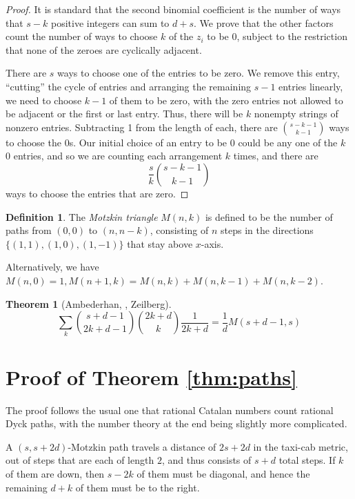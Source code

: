 \documentclass{amsart}
\theoremstyle{definition}
\newtheorem{theorem}{Theorem}
\newtheorem{definition}{Definition}
\begin{document}
\begin{proof}
It is standard that the second binomial coefficient is the number of ways that $s-k$ positive integers can sum to $d+s$.  We prove that the other factors count the number of ways to choose $k$ of the $z_i$ to be 0, subject to the restriction that none of the zeroes are cyclically adjacent.

There are $s$ ways to choose one of the entries to be zero.  We remove this entry, ``cutting'' the cycle of entries and arranging the remaining $s-1$ entries linearly, we need to choose $k-1$ of them to be zero, with the zero entries not allowed to be adjacent or the first or last entry.  Thus, there will be $k$ nonempty strings of nonzero entries.  Subtracting 1 from the length of each,  there are $\binom{s-k-1}{k-1}$ ways to choose the $0$s.  Our initial choice of an entry to be 0 could be any one of the $k$ 0 entries, and so we are counting each arrangement $k$ times, and there are
$$\frac{s}{k}\binom{s-k-1}{k-1}$$ ways to choose the entries that are zero.
\end{proof}

\begin{definition} 
The \emph{Motzkin triangle} $M(n,k)$ is defined to be the number of paths from $(0,0)$ to $(n, n-k)$, consisting of $n$ steps in the directions $\{(1,1), (1,0), (1,-1)\}$ that stay above $x$-axis.

Alternatively, we have $M(n,0)=1, M(n+1,k)=M(n,k)+M(n,k-1)+M(n,k-2)$.
\end{definition}

\begin{theorem}[Ambederhan, , Zeilberg]
$$\sum_k \binom{s+d-1}{2k+d-1}\binom{2k+d}{k}\frac{1}{2k+d}=\frac{1}{d} M(s+d-1,s)$$

\end{theorem}

\section{Proof of Theorem \ref{thm:paths}}
The proof follows the usual one that rational Catalan numbers count rational Dyck paths, with the number theory at the end being slightly more complicated.


A $(s,s+2d)$-Motzkin path travels a distance of $2s+2d$ in the taxi-cab metric, out of steps that are each of length $2$, and thus consists of $s+d$ total steps.  If $k$ of them are down, then $s-2k$ of them must be diagonal, and hence the remaining $d+k$ of them must be to the right.  
\end{document}
